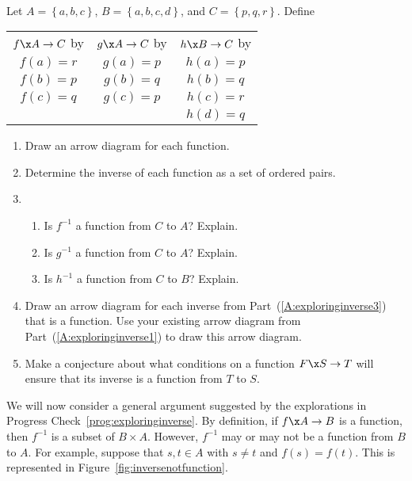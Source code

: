 \begin{center}
\end{center}

\begin{prog} \label{prog:exploringinverse} \hfill \\
Let  $A = \left\{ {a, b, c} \right\}$, $B = \left\{ {a,b,c,d} \right\}$, and 
$C = \left\{ {p, q, r} \right\}$.  Define
\begin{center}
\begin{tabular}{c | c | c}
$f\x A \to C$ by &  $g\x A \to C$ by &  $h\x B \to C$ by \\
$f( a ) = r $  &  $g( a ) = p $  &  $h( a ) = p $ \\
$f( b ) = p $  &  $g( b ) = q $  &  $h( b ) = q $ \\
$f( c ) = q $  &  $g( c ) = p $  &  $h( c ) = r $ \\
                          &                            &  $h( d ) = q $
\end{tabular}
\end{center}
\begin{enumerate}
\item Draw an arrow diagram for each function.  \label{A:exploringinverse1}

\item Determine the inverse of each function as a set of ordered pairs.

\item \begin{enumerate} \item Is  $f^{ - 1} $ a function from  $C$  to  $A$?  Explain.

  \item Is  $g^{ - 1} $ a function from  $C$  to  $A$?  Explain.

  \item Is  $h^{ - 1} $  a function from  $C$  to  $B$?  Explain.
\end{enumerate}
\label{A:exploringinverse3}

\item Draw an arrow diagram for each inverse from  Part~(\ref{A:exploringinverse3}) that is a function.  Use your existing arrow diagram from Part~(\ref{A:exploringinverse1}) to draw this arrow diagram.

\item Make a conjecture about what conditions on a function  $F\x S \to T$ will ensure that its inverse is a function  from  $T$  to  $S$.
\end{enumerate}
\end{prog}
%
We will now consider a general argument suggested by the explorations in Progress 
Check~\ref{prog:exploringinverse}.  By definition, if  $f\x A \to B$  is a function, then  
$f^{ - 1} $ is a subset of  $B \times A$.  However,  $f^{ - 1} $ may or may not be a function from  $B$  to  $A$.  For example, suppose that  $s, t \in A$ with  $s \ne t$  and  
$f( s ) = f( t )$.  This is represented in 
Figure~\ref{fig:inversenotfunction}.


